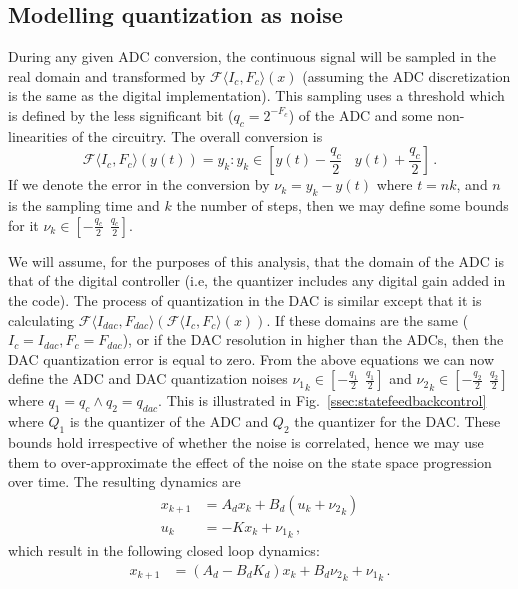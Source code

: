 \documentclass[runningheads,a4paper]{llncs}
\begin{document}
\subsection{Modelling quantization as noise} \label{appendix:quantization-noise}

During any given ADC conversion, the continuous signal will be sampled in
the real domain and transformed by $\mathcal{F}\langle I_{c},F_{c} \rangle
(x)$ (assuming the ADC discretization is the same as the digital
implementation).  This sampling uses a threshold which is defined by the
less significant bit ($q_{c}=2^{-F_c}$) of the ADC and some non-linearities
of the circuitry.  The overall conversion is
%
$$\mathcal{F}\langle I_{c},F_{c} \rangle(y(t)) = y_k :
y_k \in \left[y(t)-\frac{q_{c}}{2}\ \ \ \ y(t)+\frac{q_{c}}{2}\right] \,.$$
%
If we denote the error in the conversion by $\nu_k=y_k-y(t)$ where $t = nk$,
and $n$ is the sampling time and $k$ the number of steps, then we may define
some bounds for it $\nu_k \in [-\frac{q_{c}}{2}\ \ \frac{q_{c}}{2}]$.

We will assume, for the purposes of this analysis, that the domain of the
ADC is that of the digital controller (i.e, the quantizer includes any
digital gain added in the code).  The process of quantization in the DAC is
similar except that it is calculating $\mathcal{F}\langle I_{dac},F_{dac}
\rangle (\mathcal{F}\langle I_{c},F_{c} \rangle (x)) $.  If these domains
are the same ($I_{c}=I_{dac},\allowbreak F_{c}=F_{dac}$), or if the DAC
resolution in higher than the ADCs, then the DAC quantization error is equal
to zero.  From the above equations we can now define the ADC and DAC
quantization noises ${\nu_1}_k \in [-\frac{q_1}{2}\ \ \frac{q_1}{2}]$ and
${\nu_2}_k \in [-\frac{q_2}{2}\ \ \frac{q_2}{2}]$ where $q_1=q_{c} \wedge
q_2=q_\mathit{dac}$.  This is illustrated in
Fig.~\ref{ssec:statefeedbackcontrol} where $Q_1$ is the quantizer of the ADC
and $Q_2$ the quantizer for the DAC.  These bounds hold irrespective of
whether the noise is correlated, hence we may use them to over-approximate
the effect of the noise on the state space progression over time.  The
resulting dynamics are
%
\begin{align}
\label{eq:pre_quantization}
{x}_{k+1} &= {A}_d{x}_k+{B}_d({u}_k+{{\nu}_2}_k)\\
u_k&=-K{x}_{k}+{{\nu}_1}_k \,,
\end{align}
%
which result in the following closed loop dynamics:
%
\begin{align}
\label{eq:quantization}
{x}_{k+1} &= ({A}_d-{B}_d{K}_d) {x}_k+{B}_d{{\nu}_2}_k +{{\nu}_1}_k \,. 
\end{align}
\end{document}
